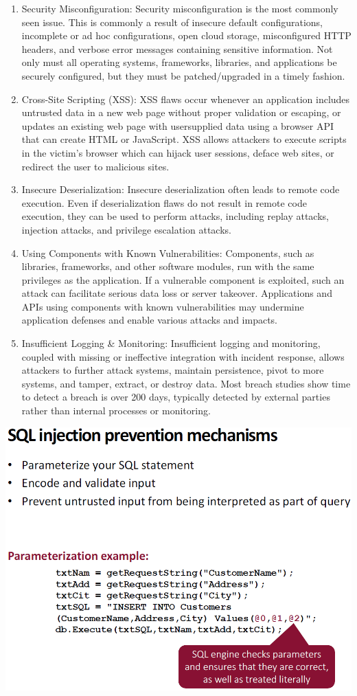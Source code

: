 \documentclass[12pt]{article}
\begin{document}
\begin{enumerate}
 	\item Security Misconfiguration: Security misconfiguration is the most commonly seen issue. This is commonly a result of insecure default configurations, incomplete or ad hoc configurations, open cloud storage, misconfigured HTTP headers, and verbose error messages containing sensitive information. Not only must all operating systems, frameworks, libraries, and applications be securely configured, but they must be patched/upgraded in a timely fashion.
 	\item Cross-Site Scripting (XSS): XSS flaws occur whenever an application includes untrusted data in a new web page without proper validation or escaping, or updates an existing web page with usersupplied data using a browser API that can create HTML or JavaScript. XSS allows attackers to execute scripts in the victim's browser which can hijack user sessions, deface web sites, or redirect the user to malicious sites.
 	\item Insecure Deserialization: Insecure deserialization often leads to remote code execution. Even if deserialization flaws do not result in remote code execution, they can be used to perform attacks, including replay attacks, injection attacks, and privilege escalation attacks.
 	\item Using Components with Known Vulnerabilities: Components, such as libraries, frameworks, and other software modules, run with the same privileges as the application. If a vulnerable component is exploited, such an attack can facilitate serious data loss or server takeover. Applications and APIs using components
 	with known vulnerabilities may undermine application defenses and enable various attacks and impacts.
 	\item Insufficient Logging \& Monitoring: Insufficient logging and monitoring, coupled with missing or ineffective integration with incident response, allows attackers to further attack systems, maintain persistence, pivot to more systems, and tamper, extract, or destroy data. Most breach studies show time to detect a breach is over 200 days, typically detected by external parties rather than internal processes or monitoring.
 \end{enumerate}
 \includegraphics[width=0.9\linewidth]{./slides/L8P2SQL.PNG}\\
\end{document}
